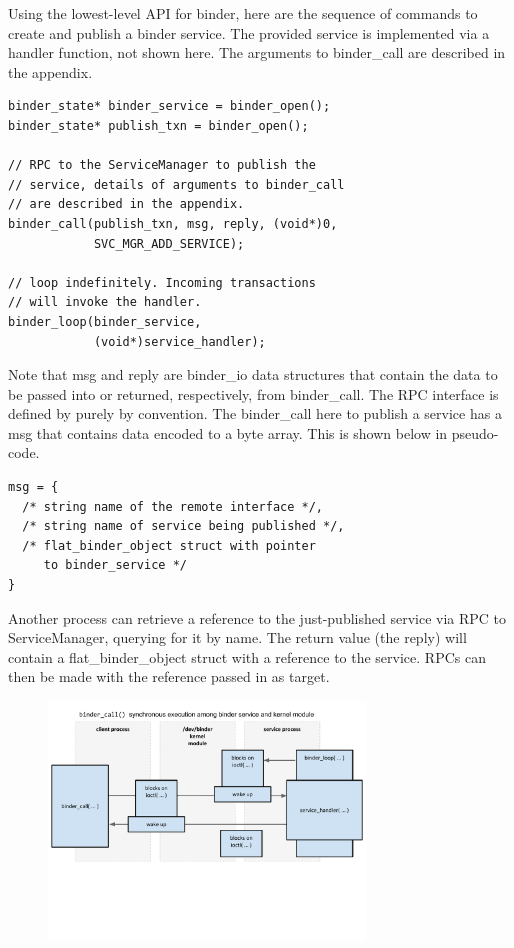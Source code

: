 \documentclass[prodmode]{acmlarge}
\begin{document}
Using the lowest-level API for binder, here are the sequence of commands to create and publish a binder service. The provided service is implemented via a handler function, not shown here. The arguments to binder\_call are described in the appendix.

\begin{Verbatim}[samepage=true]
binder_state* binder_service = binder_open();
binder_state* publish_txn = binder_open();

// RPC to the ServiceManager to publish the
// service, details of arguments to binder_call
// are described in the appendix.
binder_call(publish_txn, msg, reply, (void*)0,
            SVC_MGR_ADD_SERVICE);

// loop indefinitely. Incoming transactions
// will invoke the handler.
binder_loop(binder_service,
            (void*)service_handler);
\end{Verbatim}

Note that msg and reply are binder\_io data structures that contain the data to be passed into or returned, respectively, from binder\_call. The RPC interface is defined by purely by convention. The binder\_call here to publish a service has a msg that contains data encoded to a byte array. This is shown below in pseudo-code.

\begin{Verbatim}[samepage=true]
msg = {
  /* string name of the remote interface */,
  /* string name of service being published */,
  /* flat_binder_object struct with pointer
     to binder_service */
}
\end{Verbatim}

Another process can retrieve a reference to the just-published service via RPC to ServiceManager, querying for it by name. The return value (the reply) will contain a flat\_binder\_object struct with a reference to the service. RPCs can then be made with the reference passed in as target.

\begin{figure}
\centering
\includegraphics[width=0.75\textwidth]{drawings/binder_call.pdf}
\end{figure}
\end{document}
